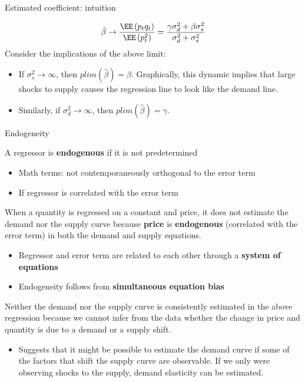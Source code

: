 \documentclass[compress, 8pt]{beamer}
\begin{document}
\begin{frame}{Estimated coefficient: intuition}

\begin{equation*}
    \hat{\beta} \rightarrow \frac{\EE\left(p_{t}q_{t}\right)}{\EE\left(p_{t}^{2}\right)} = \frac{\gamma\sigma_{d}^{2}+\beta\sigma_{s}^{2}}{\sigma_{d}^{2}+\sigma_{s}^{2}}
\end{equation*}
Consider the implications of the above limit:
\begin{itemize}
     \item If $\sigma_{s}^{2}\to\infty$,
then $plim\left(\hat{\beta}\right)=\beta$. 
Graphically, this dynamic
implies that large shocks to supply causes the regression line to
look like the demand line.
\item Similarly, if $\sigma_{d}^{2}\to\infty$,
then $plim\left(\hat{\beta}\right)=\gamma$.
 \end{itemize}  

\end{frame}

\begin{frame}{Endogeneity}

A regressor is \textbf{endogenous} if it is not predetermined
\begin{itemize}
     \item Math terms: not contemporaneously orthogonal to the error term
     \item If regressor is correlated with the error term
 \end{itemize}
When a quantity is regressed on a constant and price, it does not
estimate the demand nor the supply curve because \textbf{price} is \textbf{endogenous} (correlated with the error term) in both the demand and supply equations. 
\begin{itemize}
    \item Regressor and error term are related to each other through a \textbf{system of equations}
    \item Endogeneity follows from \textbf{simultaneous
equation bias}
\end{itemize}

Neither the demand nor the supply curve is consistently estimated
in the above regression because we cannot infer from the data whether
the change in price and quantity is due to a demand or a supply shift.
\begin{itemize}
    \item Suggests that it might be possible to estimate the demand curve
if some of the factors that shift the supply curve are observable.
If we only were observing shocks to the supply, demand elasticity
can be estimated. 
\end{itemize}


\end{frame}
\end{document}
